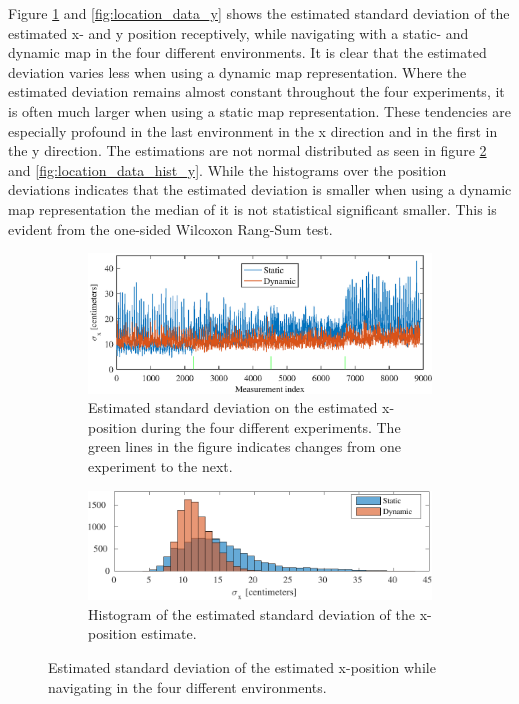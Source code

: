 Figure \ref{fig:location_data_x} and \ref{fig:location_data_y} shows the estimated standard deviation of the estimated x- and y position receptively, while navigating with a static- and dynamic map in the four different environments. 
It is clear that the estimated deviation varies less when using a dynamic map representation.
Where the estimated deviation remains almost constant throughout the four experiments, it is often much larger when using a static map representation. 
These tendencies are especially profound in the last environment in the x direction and in the first in the y direction. 
The estimations are not normal distributed as seen in figure \ref{fig:location_data_hist_x} and \ref{fig:location_data_hist_y}.
While the histograms over the position deviations indicates that the estimated deviation is smaller when using a dynamic map representation the median of it is not statistical significant smaller. This is evident from the one-sided Wilcoxon Rang-Sum test.
\begin{figure}[htbp]
	\begin{subfigure}[t]{1\textwidth}	
		\centering	
		\includegraphics[scale=1.0]{chapters/evaluation/figures/location_data_x}	
		\caption{Estimated standard deviation on the estimated x-position during the four different experiments. The green lines in the figure indicates changes from one experiment to the next.}
		\label{fig:location_data_x}
	\end{subfigure}
	
	\begin{subfigure}[t]{1\textwidth}
		\centering
		\includegraphics[scale=1.0]{chapters/evaluation/figures/location_data_hist_x-crop}
		\caption{Histogram of the estimated standard deviation of the x-position estimate.}
		\label{fig:location_data_hist_x}
	\end{subfigure}
	\caption{Estimated standard deviation of the estimated x-position while navigating in the four different environments.}
	\label{fig:location_x_evaluation}
\end{figure}

